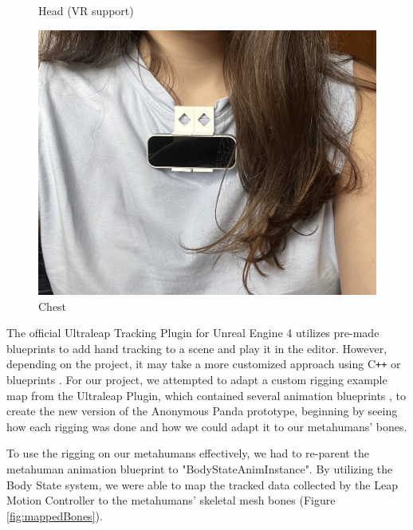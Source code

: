 \begin{table}[!htb]
\begin{minipage}{\linewidth}
\begin{subfigure}{0.4\textwidth}
            \caption{Head (VR support) \cite{LEAPVR}}
        \end{subfigure}
        \begin{subfigure}{0.4\textwidth}
            \includegraphics[width=\linewidth]{figures/CMD.jpg}
            \centering
            \caption{Chest}
        \end{subfigure}
        \label{fig:CMDvsHMD}
	\end{minipage}
\end{table}

The official Ultraleap Tracking Plugin for Unreal Engine 4 utilizes pre-made blueprints to add hand tracking to a scene and play it in the editor. However, depending on the project, it may take a more customized approach using C\texttt{+}\texttt{+} or blueprints \cite{ULTGIT}. For our project, we attempted to adapt a custom rigging example map from the Ultraleap Plugin, which contained several animation blueprints \cite{LEAPMOD}, to create the new version of the Anonymous Panda prototype, beginning by seeing how each rigging was done and how we could adapt it to our metahumans' bones.

To use the rigging on our metahumans effectively, we had to re-parent the metahuman animation blueprint to "BodyStateAnimInstance". By utilizing the Body State system, we were able to map the tracked data collected by the Leap Motion Controller to the metahumans' skeletal mesh bones (Figure \ref{fig:mappedBones}).


